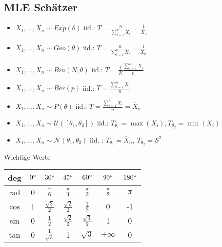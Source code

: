 \subsection{MLE Schätzer}\label{sec:mle-schaetzer}
\begin{itemize}
  \item $X_1, ..., X_n \sim Exp(\theta)$ iid.: $T = \frac{n}{\sum_{i=1}^n X_i} = \frac{1}{\overline{X}_n}$
  \item $X_1, ..., X_n \sim Geo(\theta)$ iid.: $T = \frac{n}{\sum_{i=1}^n X_i} = \frac{1}{\overline{X}_n}$
  \item $X_1, ..., X_n \sim Bin(N, \theta)$ iid.: $T = \frac{1}{N}\frac{\sum_{i = 1}^n X_i}{n}$
  \item $X_1, ..., X_n \sim Ber(p)$ iid.: $T = \frac{\sum_{i = 1}^n X_i}{n}$
  \item $X_1, ..., X_n \sim P(\theta)$ iid.: $T = \frac{\sum_{i = 1}^n X_i}{n} = \overline{X}_n$
  \item $X_1, ..., X_n \sim \mathcal{U}([\theta_1, \theta_2])$ iid.: $T_{\theta_1} = \max(X_i), T_{\theta_2} = \min(X_i)$
  \item $X_1, ..., X_n \sim \mathcal{N}(\theta_1, \theta_2)$ iid. : $T_{\theta_1} = \overline{X}_n, \ T_{\theta_2} = S^2$
\end{itemize}

\begin{mainbox}{Wichtige Werte}
  \begin{center}
    \begin{tabular}{c|cccccc}
      deg & $0 \degree $ & $30 \degree $        & $45 \degree $        & $60 \degree $        & $90 \degree $   & $180 \degree $ \\
      \hline
      rad & 0            & $\frac{\pi}{6}$      & $\frac{\pi}{4}$      & $\frac{\pi}{3}$      & $\frac{\pi}{2}$ & $\pi$          \\
      cos & 1            & $\frac{\sqrt{3}}{2}$ & $\frac{\sqrt{2}}{2}$ & $\frac{1}{2}$        & 0               & -1             \\
      sin & 0            & $\frac{1}{2}$        & $\frac{\sqrt{2}}{2}$ & $\frac{\sqrt{3}}{2}$ & 1               & 0              \\
      tan & 0            & $\frac{1}{\sqrt{3}}$ & 1                    & $\sqrt{3}$           & $+\infty$       & 0              \\
    \end{tabular}
  \end{center}
\end{mainbox}


